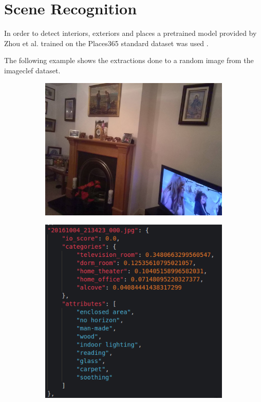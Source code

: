 \section{Scene Recognition}
\label{sec:scene_recognition}
  In order to detect interiors, exteriors and places a pretrained model provided by Zhou et al. \cite{Zhou2018}  trained on the Places365 standard dataset was used .

  The following example shows the extractions done to a random image from the imageclef dataset. 

  \begin{figure}[H]
    \centering
    \captionsetup{justification=centering}

    \begin{subfigure}{0.525\textwidth}
    
    \includegraphics[width=\textwidth]{Sections/4InitialWork/4_images_random/dataset_place.jpg} 
    \caption{}
    \end{subfigure}
    \begin{subfigure}{0.4\textwidth}
    \includegraphics[width=\textwidth]{Sections/4InitialWork/4_images_random/places_detect.png}

\end{subfigure}
\end{figure}
